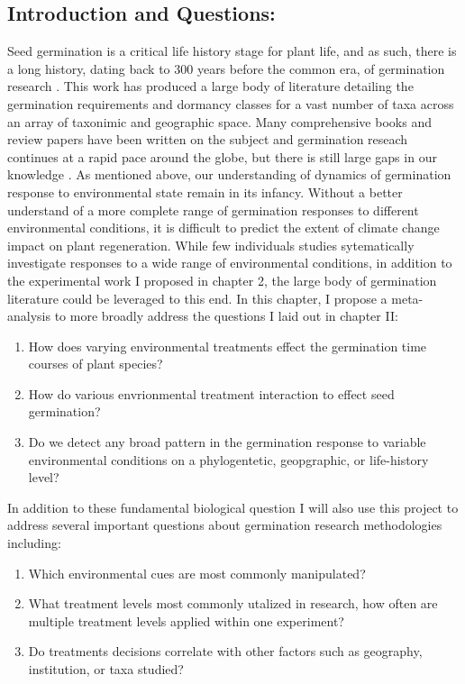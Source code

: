 \documentclass{article}\usepackage[]{graphicx}\usepackage[]{color}
\begin{document}
\subsection*{Introduction and Questions:}
\indent Seed germination is a critical life history stage for plant life, and as such, there is a long history, dating back to 300 years before the common era, of germination research \citep{Baskin2014}. This work has produced a large body of literature detailing the germination requirements and dormancy classes for a vast number of taxa across an array of taxonimic and geographic space. Many comprehensive books and review papers have been written on the subject and germination reseach continues at a rapid pace around the globe, but there is still large gaps in our knowledge \citep{Baskin2014}. As mentioned above, our understanding of  dynamics of germination response to environmental state remain in its infancy.  Without a better understand of a more complete range of germination responses to different environmental conditions, it is difficult to predict the extent of climate change impact on plant regeneration. While few individuals studies sytematically investigate responses to a wide range of environmental conditions, in addition to the experimental work I proposed in chapter 2, the large body of germination literature could be leveraged to this end. In this chapter, I propose a meta-analysis to more broadly address the questions I laid out in chapter II:
\begin{enumerate}
\item How does varying environmental treatments effect the germination time courses of plant species?
\item How do various envrionmental treatment interaction to effect seed germination?
\item Do we detect any broad pattern in the germination response to variable environmental conditions on a phylogentetic, geopgraphic, or life-history level?
\end{enumerate}
\indent In addition to these fundamental biological question I will also use this project to address several important questions about germination research methodologies including:
\begin{enumerate}
\item Which environmental cues are most commonly manipulated?
\item What treatment levels most commonly utalized in research, how often are multiple treatment levels applied within one experiment?
\item Do treatments decisions correlate with other factors such as geography, institution, or taxa studied?
\end{enumerate}
\end{document}
